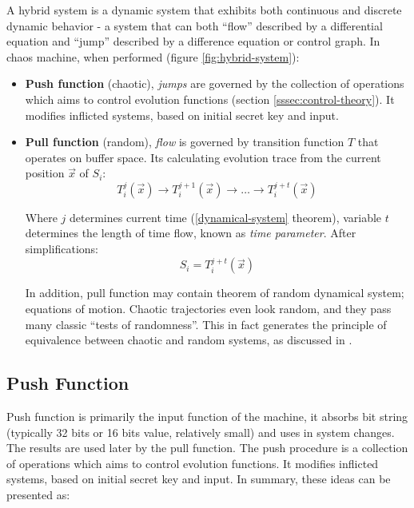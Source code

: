 \documentclass[twocolumn, a4paper, 10pt]{article}
\begin{document}
A hybrid system is a dynamic system that exhibits both continuous and discrete dynamic behavior - a system that can both ``flow'' described by a differential equation and ``jump'' described by a difference equation or control graph. In chaos machine, when performed (figure \ref{fig:hybrid-system}):

\begin{itemize}

\item\textbf{Push function} (chaotic), \textit{jumps} are governed by the collection of operations which aims to control evolution functions (section \ref{sssec:control-theory}). It modifies inflicted systems, based on initial secret key and input.

\item\textbf{Pull function} (random), \textit{flow} is governed by transition function $T$ that operates on buffer space. Its calculating evolution trace from the current position $\vec{x}$ of $S_i$: $$T^j_i(\vec{x}) \to T^{j+1}_i(\vec{x}) \to \dots \to T^{j+t}_i(\vec{x})$$

Where $j$ determines current time (\ref{dynamical-system} theorem), variable $t$ determines the length of time flow, known as \textit{time parameter}. After simplifications: $$S_i = T^{j+t}_i(\vec{x})$$

In addition, pull function may contain theorem of random dynamical system; equations of motion. Chaotic trajectories even look random, and they pass many classic ``tests of randomness''. This in fact generates the principle of equivalence between chaotic and random systems, as discussed in \cite{2013arXiv1310.1615W}.

\end{itemize}


\subsection{Push Function}

Push function is primarily the input function of the machine, it absorbs bit string (typically 32 bits or 16 bits value, relatively small) and uses in system changes. The results are used later by the pull function. The push procedure is a collection of operations which aims to control evolution functions. It modifies inflicted systems, based on initial secret key and input. In summary, these ideas can be presented as:
\end{document}
